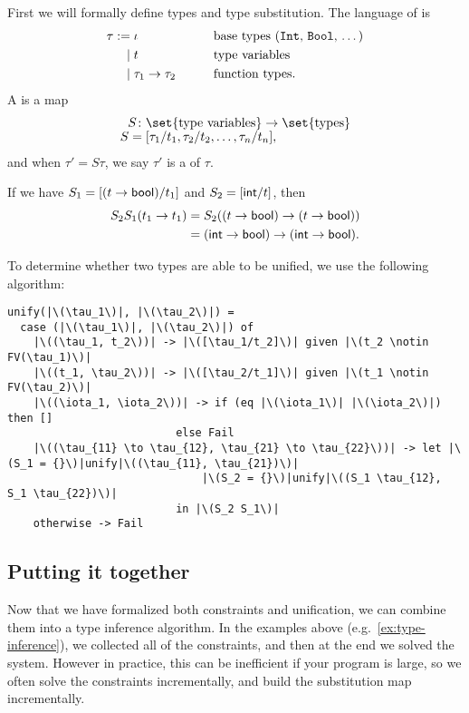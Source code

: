 \documentclass[class=scrartcl]{standalone}
\begin{document}
First we will formally define types and type substitution.
The language of  is
\begin{alignat*}{4}
  \tau :={} & \iota && \qquad
    \text{base types
          (\texttt{Int}, \texttt{Bool}, \dots)} \\
  \mid{} & t && \qquad\text{type variables} \\
  \mid{} & \tau_1 \to \tau_2 && \qquad\text{function types}.
\end{alignat*}
A  is a map
\begin{align*}
  S \colon& \set{\text{type variables}} \to \set{\text{types}} \\[-1ex]
  S ={}& [\tau_1/t_1, \tau_2/t_2, \dots, \tau_n/t_n],
\end{align*}
and when \(\tau' = S \tau\),
we say \(\tau'\) is a  of \(\tau\).

\begin{example}
  If we have \(S_1 = [(t \to \textsf{bool}) / t_1]\) and \(S_2 = [\textsf{int} / t]\), then
  \begin{align*}
    S_2 S_1 (t_1 \to t_1) &= S_2 ((t \to \textsf{bool}) \to (t \to \textsf{bool})) \\
      &= (\textsf{int} \to \textsf{bool}) \to (\textsf{int} \to \textsf{bool}).
  \end{align*}
\end{example}

To determine whether two types are able to be unified,
we use the following algorithm:
\begin{verbatim}
unify(|\(\tau_1\)|, |\(\tau_2\)|) =
  case (|\(\tau_1\)|, |\(\tau_2\)|) of
    |\((\tau_1, t_2\))| -> |\([\tau_1/t_2]\)| given |\(t_2 \notin FV(\tau_1)\)|
    |\((t_1, \tau_2\))| -> |\([\tau_2/t_1]\)| given |\(t_1 \notin FV(\tau_2)\)|
    |\((\iota_1, \iota_2\))| -> if (eq |\(\iota_1\)| |\(\iota_2\)|) then []
                          else Fail
    |\((\tau_{11} \to \tau_{12}, \tau_{21} \to \tau_{22}\))| -> let |\(S_1 = {}\)|unify|\((\tau_{11}, \tau_{21})\)|
                              |\(S_2 = {}\)|unify|\((S_1 \tau_{12}, S_1 \tau_{22})\)|
                          in |\(S_2 S_1\)|
    otherwise -> Fail
\end{verbatim}

\subsection{Putting it together}
Now that we have formalized both constraints and unification,
we can combine them into a type inference algorithm.
In the examples above (e.g.\ \cref{ex:type-inference}),
we collected all of the constraints,
and then at the end we solved the system.
However in practice, this can be inefficient if your program is large,
so we often solve the constraints incrementally,
and build the substitution map incrementally.
\end{document}
